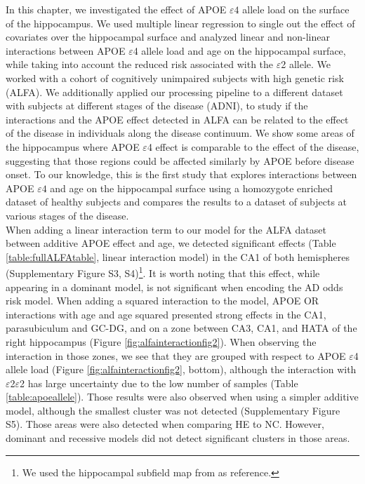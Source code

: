 In this chapter, we investigated the effect of APOE $\varepsilon4$ allele load on the surface of the hippocampus. We used multiple linear regression to single out the effect of covariates over the hippocampal surface and analyzed linear and non-linear interactions between APOE $\varepsilon$4 allele load and age on the hippocampal surface, while taking into account the reduced risk associated with the $\varepsilon$2 allele. We worked with a cohort of cognitively unimpaired subjects with high genetic risk (ALFA). We additionally applied our processing pipeline to a different dataset with subjects at different stages of the disease (ADNI), to study if the interactions and the APOE effect detected in ALFA can be related to the effect of the disease in individuals along the disease continuum. We show some areas of the hippocampus where APOE $\varepsilon$4 effect is comparable to the effect of the disease, suggesting that those regions could be affected similarly by APOE before disease onset. To our knowledge, this is the first study that explores interactions between APOE $\varepsilon4$ and age on the hippocampal surface using a homozygote enriched dataset of healthy subjects and compares the results to a dataset of subjects at various stages of the disease. \\

When adding a linear interaction term to our model for the ALFA dataset between additive APOE effect and age, we detected significant effects (Table \ref{table:fullALFAtable}, linear interaction model) in the CA1 of both hemispheres (Supplementary Figure S3, S4)\footnote{We used the hippocampal subfield map from \cite{Iglesias2015} as reference.}. It is worth noting that this effect, while appearing in a dominant model, is not significant when encoding the AD odds risk model. When adding a squared interaction to the model, APOE OR interactions with age and age squared presented strong effects in the CA1, parasubiculum and GC-DG, and on a zone between CA3, CA1, and HATA of the right hippocampus (Figure \ref{fig:alfainteractionfig2}). When observing the interaction in those zones, we see that they are grouped with respect to APOE $\varepsilon$4 allele load (Figure \ref{fig:alfainteractionfig2}, bottom), although the interaction with $\varepsilon$2$\varepsilon$2 has large uncertainty due to the low number of samples (Table \ref{table:apoeallele}). Those results were also observed when using a simpler additive model, although the smallest cluster was not detected (Supplementary Figure S5). Those areas were also detected when comparing HE to NC. However, dominant and recessive models did not detect significant clusters in those areas. \\


